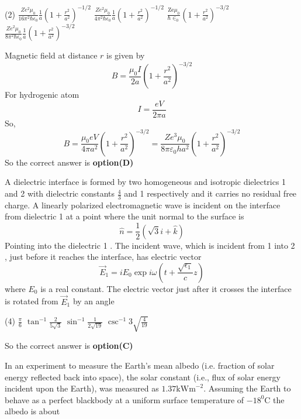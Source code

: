 \begin{questions}
\begin{tasks}(2)
	\task[\textbf{A.}] $\frac{Z e^{2} \mu_{0}}{16 \pi^{2} \hbar \epsilon_{0}} \frac{1}{a}\left(1+\frac{r^{2}}{a^{2}}\right)^{-1 / 2}$
	\task[\textbf{B.}]   $\frac{Z e^{2} \mu_{0}}{4 \pi^{2} \hbar \epsilon_{0}} \frac{1}{a}\left(1+\frac{r^{2}}{a^{2}}\right)^{-1 / 2}$
	\task[\textbf{C.}] $\frac{\mathrm{Ze} \mu_{0}}{\hbar \in_{0}}\left(1+\frac{r^{2}}{a^{2}}\right)^{-3 / 2}$
	\task[\textbf{D.}] $\frac{Z e^{2} \mu_{0}}{8 \pi^{2} \hbar \epsilon_{0}} \frac{1}{a}\left(1+\frac{r^{2}}{a^{2}}\right)^{-3 / 2}$
\end{tasks}
\begin{answer}
	Magnetic field at distance $r$ is given by
	$$
	B=\frac{\mu_{0} I}{2 a}\left(1+\frac{r^{2}}{a^{2}}\right)^{-3 / 2}
	$$
	For hydrogenic atom
	$$
	I=\frac{e V}{2 \pi a}
	$$
	So,
	$$
	B=\frac{\mu_{0} e V}{4 \pi a^{2}}\left(1+\frac{r^{2}}{a^{2}}\right)^{-3 / 2}=\frac{Z e^{3} \mu_{0}}{8 \pi \varepsilon_{0} h a^{2}}\left(1+\frac{r^{2}}{a^{2}}\right)^{-3 / 2}
	$$
	So the correct answer is \textbf{option(D)}
\end{answer}
\begin{minipage}{\textwidth}
	\question A dielectric interface is formed by two homogeneous and isotropic dielectrics 1 and 2 with dielectric constants $\frac{4}{3}$ and 1 respectively and it carries no residual free charge. A linearly polarized electromagnetic wave is incident on the interface from dielectric 1 at a point where the unit normal to the surface is
	$$
	\hat{n}=\frac{1}{2}(\sqrt{3} i+\hat{k})
	$$
	Pointing into the dielectric 1 . The incident wave, which is incident from 1 into 2 , just before it reaches the interface, has electric vector
	$$
	\vec{E}_{1}=i E_{0} \exp i \omega\left(t+\frac{\sqrt{\epsilon_{1}}}{c} z\right)
	$$
	where $E_{0}$ is a real constant. The electric vector just after it crosses the interface is rotated from $\vec{E}_{1}$ by an angle
\end{minipage}
\begin{tasks}(4)
	\task[\textbf{A.}] $\frac{\pi}{6}$
	\task[\textbf{B.}] $\tan ^{-1} \frac{2}{5 \sqrt{3}}$
	\task[\textbf{C.}] $\sin ^{-1} \frac{1}{2 \sqrt{19}}$
	\task[\textbf{D.}] $\csc ^{-1} 3 \sqrt{\frac{4}{19}}$
\end{tasks}
\begin{answer}
		So the correct answer is \textbf{option(C)}
\end{answer}
\begin{minipage}{\textwidth}
	\question In an experiment to measure the Earth's mean albedo (i.e. fraction of solar energy reflected back into space), the solar constant (i.e., flux of solar energy incident upon the Earth), was measured as $1.37 \mathrm{kWm}^{-2}$. Assuming the Earth to behave as a perfect blackbody at a uniform surface temperature of $-18^{0} \mathrm{C}$ the albedo is about

\end{minipage}
\end{questions}
